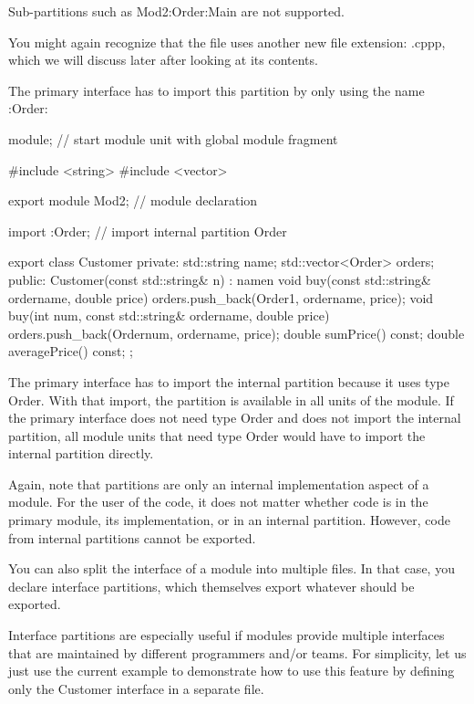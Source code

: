 Sub-partitions such as Mod2:Order:Main are not supported.

You might again recognize that the file uses another new file extension: .cppp, which we will discuss later after looking at its contents.

The primary interface has to import this partition by only using the name :Order:


\begin{cpp}
module; // start module unit with global module fragment

#include <string>
#include <vector>

export module Mod2; // module declaration

import :Order; // import internal partition Order

export class Customer {
private:
	std::string name;
	std::vector<Order> orders;
public:
	Customer(const std::string& n)
	: name{n} {
	}
	void buy(const std::string& ordername, double price) {
		orders.push_back(Order{1, ordername, price});
	}
	void buy(int num, const std::string& ordername, double price) {
		orders.push_back(Order{num, ordername, price});
	}
	double sumPrice() const;
	double averagePrice() const;
};
\end{cpp}

The primary interface has to import the internal partition because it uses type Order. With that import, the partition is available in all units of the module. If the primary interface does not need type Order and does not import the internal partition, all module units that need type Order would have to import the internal partition directly.

Again, note that partitions are only an internal implementation aspect of a module. For the user of the code, it does not matter whether code is in the primary module, its implementation, or in an internal partition. However, code from internal partitions cannot be exported.


You can also split the interface of a module into multiple files. In that case, you declare interface partitions, which themselves export whatever should be exported.

Interface partitions are especially useful if modules provide multiple interfaces that are maintained by different programmers and/or teams. For simplicity, let us just use the current example to demonstrate how to use this feature by defining only the Customer interface in a separate file.

